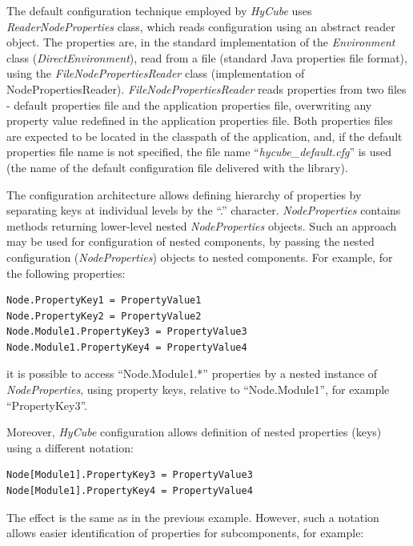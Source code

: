 The default configuration technique employed by \emph{HyCube} uses \emph{ReaderNodeProperties} class, which reads configuration using an abstract reader object. The properties are, in the standard implementation of the \emph{Environment} class (\emph{DirectEnvironment}), read from a file (standard Java properties file format), using the \emph{FileNodePropertiesReader} class (implementation of NodePropertiesReader). \emph{FileNodePropertiesReader} reads properties from two files - default properties file and the application properties file, overwriting any property value redefined in the application properties file. Both properties files are expected to be located in the classpath of the application, and, if the default properties file name is not specified, the file name ``\emph{hycube\_default.cfg}'' is used (the name of the default configuration file delivered with the library).


The configuration architecture allows defining hierarchy of properties by separating keys at individual levels by the ``.'' character. \emph{NodeProperties} contains methods returning lower-level nested \emph{NodeProperties} objects. Such an approach may be used for configuration of nested components, by passing the nested configuration (\emph{NodeProperties}) objects to nested components. For example, for the following properties:

\begin{lstlisting}[style=listing1noindent]
Node.PropertyKey1 = PropertyValue1
Node.PropertyKey2 = PropertyValue2
Node.Module1.PropertyKey3 = PropertyValue3
Node.Module1.PropertyKey4 = PropertyValue4
\end{lstlisting}

\noindent
it is possible to access ``Node.Module1.*'' properties by a nested instance of \emph{NodeProperties}, using property keys, relative to ``Node.Module1'', for example ``PropertyKey3''.

Moreover, \emph{HyCube} configuration allows definition of nested properties (keys) using a different notation:

\begin{lstlisting}[style=listing1noindent]
Node[Module1].PropertyKey3 = PropertyValue3
Node[Module1].PropertyKey4 = PropertyValue4
\end{lstlisting}

\noindent
The effect is the same as in the previous example. However, such a notation allows easier identification of properties for subcomponents, for example:

